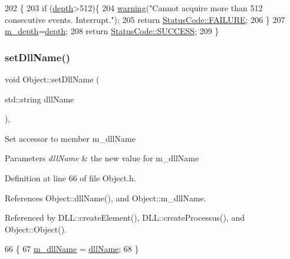 \begin{DoxyCode}
202                                                     \{
203   \textcolor{keywordflow}{if} (\hyperlink{classAcquisition_a1ad973e21a067c0de0b6264d0eb5182b}{depth}>512)\{
204     \hyperlink{classObject_a65cd4fda577711660821fd2cd5a3b4c9}{warning}(\textcolor{stringliteral}{"Cannot acquire more than 512 consecutive events. Interrupt."});
205     \textcolor{keywordflow}{return} \hyperlink{classStatusCode_a6f565cbeadc76d14c72f047e5e85eb4ba3da73d4c469762eb9d3c960368252b26}{StatusCode::FAILURE};
206   \}
207   \hyperlink{classAcquisition_a26628424533a2dd74d24712a14637a72}{m\_depth}=\hyperlink{classAcquisition_a1ad973e21a067c0de0b6264d0eb5182b}{depth};
208   \textcolor{keywordflow}{return} \hyperlink{classStatusCode_a6f565cbeadc76d14c72f047e5e85eb4badd0da38d3ba0d922efd1f4619bc37ad8}{StatusCode::SUCCESS};
209 \}
\end{DoxyCode}
\mbox{\label{classObject_a870c5af919958c2136623b2d7816d123}} 
\subsubsection{\texorpdfstring{set\+Dll\+Name()}{setDllName()}}
{\footnotesize\ttfamily void Object\+::set\+Dll\+Name (\begin{DoxyParamCaption}\item[{std\+::string}]{dll\+Name }\end{DoxyParamCaption})\hspace{0.3cm}{\ttfamily [inline]}, {\ttfamily [inherited]}}

Set accessor to member m\+\_\+dll\+Name 
\begin{DoxyParams}{Parameters}
{\em dll\+Name} & the new value for m\+\_\+dll\+Name \\
\hline
\end{DoxyParams}


Definition at line 66 of file Object.\+h.



References Object\+::dll\+Name(), and Object\+::m\+\_\+dll\+Name.



Referenced by D\+L\+L\+::create\+Element(), D\+L\+L\+::create\+Processus(), and Object\+::\+Object().


\begin{DoxyCode}
66                                       \{
67     \hyperlink{classObject_a01afbeacebb8db6831559972ec362eb3}{m\_dllName} = \hyperlink{classObject_a2e3947f2870094c332d7454117f3ec63}{dllName};
68   \}
\end{DoxyCode}
\mbox{\label{classProcessus_a8ddef94227d83d9dae2cd49aebc33353}} 
